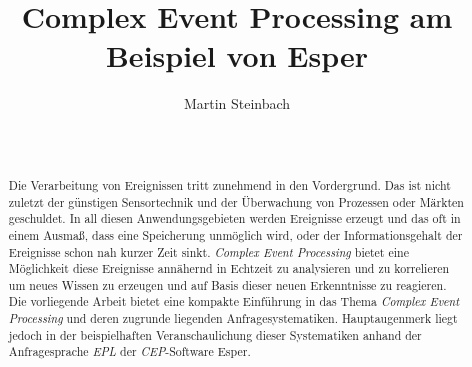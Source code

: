 \documentclass{acm_proc_article-sp}
\begin{document}
\title{Complex Event Processing am Beispiel von Esper}
\author{
\alignauthor
Martin Steinbach\vspace{0.1cm}\\
       \\
       \\
       }




\maketitle

\begin{abstract}
\vspace{0.1cm}
Die Verarbeitung von Ereignissen tritt zunehmend in den Vordergrund. Das ist nicht 
zuletzt der günstigen Sensortechnik und der Überwachung von Prozessen oder Märkten 
geschuldet. In all diesen Anwendungsgebieten werden Ereignisse erzeugt und das oft in 
einem Ausmaß, dass eine Speicherung unmöglich wird, oder der Informationsgehalt der 
Ereignisse schon nah kurzer Zeit sinkt. \textit{Complex Event Processing} bietet eine 
Möglichkeit diese Ereignisse annähernd in Echtzeit zu analysieren und zu korrelieren um 
neues Wissen zu erzeugen und auf Basis dieser neuen Erkenntnisse zu reagieren. Die 
vorliegende Arbeit bietet eine kompakte Einführung in das Thema \textit{Complex Event 
Processing} und deren zugrunde liegenden Anfragesystematiken. Hauptaugenmerk liegt jedoch 
in der beispielhaften Veranschaulichung dieser Systematiken anhand der Anfragesprache 
\textit{EPL} der \textit{CEP}-Software Esper.

\end{abstract}


\end{document}
